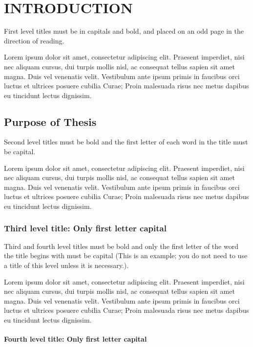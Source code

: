 \chapter{INTRODUCTION}\label{introduction}
First level titles must be in capitals and bold, and placed on an odd page in the direction of reading. 

Lorem ipsum dolor sit amet, consectetur adipiscing elit. Praesent imperdiet, nisi 
nec aliquam cursus, dui turpis mollis nisl, ac consequat tellus sapien sit amet 
magna. Duis vel venenatis velit. Vestibulum ante ipsum primis in faucibus orci 
luctus et ultrices posuere cubilia Curae; Proin malesuada risus nec metus dapibus 
eu tincidunt lectus dignissim. 

\section{Purpose of Thesis}\label{purposeofthesis}

Second level titles must be bold and the first letter of each word in the title must be capital. 

Lorem ipsum dolor sit amet, consectetur adipiscing elit. Praesent imperdiet, nisi 
nec aliquam cursus, dui turpis mollis nisl, ac consequat tellus sapien sit amet 
magna. Duis vel venenatis velit. Vestibulum ante ipsum primis in faucibus orci 
luctus et ultrices posuere cubilia Curae; Proin malesuada risus nec metus dapibus 
eu tincidunt lectus dignissim. 
\subsection{Third level title: Only first letter capital}

Third and fourth level titles must be bold and only the first letter of the word the title begins with must be capital (This is an example; you do not need to use a title of this level unless it is necessary.).

Lorem ipsum dolor sit amet, consectetur adipiscing elit. Praesent imperdiet, nisi 
nec aliquam cursus, dui turpis mollis nisl, ac consequat tellus sapien sit amet 
magna. Duis vel venenatis velit. Vestibulum ante ipsum primis in faucibus orci 
luctus et ultrices posuere cubilia Curae; Proin malesuada risus nec metus dapibus 
eu tincidunt lectus dignissim.

\subsubsection{Fourth level title: Only first letter capital}

